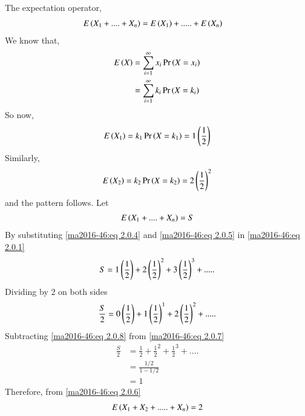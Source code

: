 The expectation operator, 
\begin{align}
    E\left(X_1 + .... + X_n\right)
    &= E\left(X_1\right) +.....+ E\left(X_n\right) \label{ma2016-46:eq 2.0.1}
\end{align}
We know that, 
\begin{align}
    E\left(X\right) 
    &= \sum_{i = 1}^\infty x_i\Pr\left(X = x_i\right)\\
    &=  \sum_{i = 1}^\infty k_i\Pr\left(X = k_i\right) \label{ma2016-46:eq 2.0.3}
\end{align}
So now, 
\begin{align}
    E\left(X_1\right) = k_1\Pr\left(X = k_1\right) = 1 \left(\frac{1}{2}\right) \label{ma2016-46:eq 2.0.4}
\end{align}
Similarly, 
\begin{align}
    E\left(X_2\right) = k_2\Pr\left(X = k_2\right) = 2 \left(\frac{1}{2}\right)^{2} \label{ma2016-46:eq 2.0.5}
\end{align}
and the pattern follows.
Let 
\begin{align}
    E\left(X_1 + .... + X_n\right) = S \label{ma2016-46:eq 2.0.6}
\end{align}
By substituting \eqref{ma2016-46:eq 2.0.4} and \eqref{ma2016-46:eq 2.0.5} in \eqref{ma2016-46:eq 2.0.1}
\begin{align}
    S = 1 \left(\frac{1}{2}\right) + 2 \left(\frac{1}{2}\right)^{2} + 3\left(\frac{1}{2}\right)^{3} + ..... \label{ma2016-46:eq 2.0.7}
\end{align}
Dividing by 2 on both sides 
\begin{align}
   \frac{S}{2} =  0\left(\frac{1}{2}\right) + 1\left(\frac{1}{2}\right)^{1} + 2\left(\frac{1}{2}\right)^{2} + ..... \label{ma2016-46:eq 2.0.8}
\end{align}
Subtracting \eqref{ma2016-46:eq 2.0.8} from \eqref{ma2016-46:eq 2.0.7}
\begin{align}
    \frac{S}{2} 
    &= \frac{1}{2} + \frac{1}{2}^{2} + \frac{1}{2}^{3}  + ....\\
    &= \frac{1/2}{1-1/2} \\
    &= 1
\end{align}
Therefore, from \eqref{ma2016-46:eq 2.0.6}
\begin{align}
    E \left(X_1 + X_2 +..... + X_n\right) = 2
\end{align}
